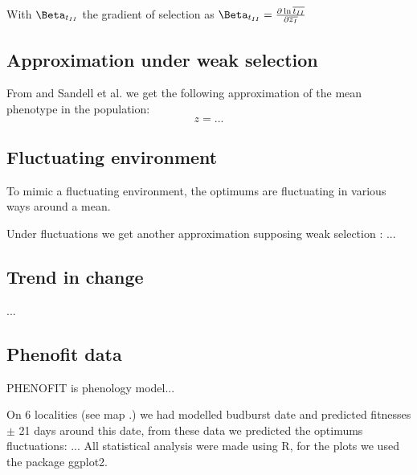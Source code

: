 With $\Beta_{t_{II}}$ the gradient of selection as $\Beta_{t_{II}} = \frac{\partial \ln \overline{t_{II}}}{\partial \overline{z_I}}$

\subsection*{Approximation under weak selection}

From \citep{engen_evolution_2011} and Sandell et al. we get the following approximation of the mean phenotype in the population:
\begin{equation}
	z = ...
\end{equation}

\subsection*{Fluctuating environment}

To mimic a fluctuating environment, the optimums are fluctuating in various ways around a mean.

Under fluctuations we get another approximation supposing weak selection \citep{engen_evolution_2011}:
...

\subsection*{Trend in change}
...

\subsection*{Phenofit data}

PHENOFIT is phenology model...

On 6 localities (see map .) we had modelled budburst date and predicted fitnesses $\pm$ 21 days around this date, from these data we predicted the optimums fluctuations:
...
All statistical analysis were made using R, for the plots we used the package ggplot2.

